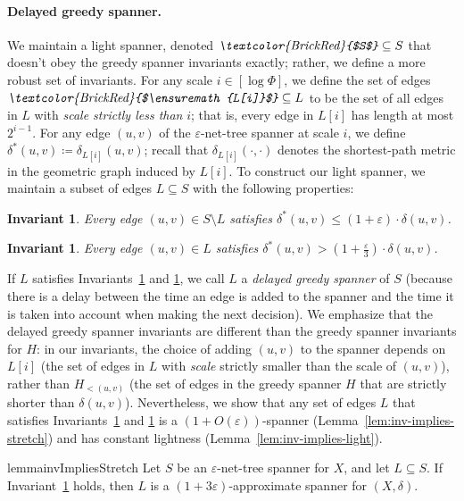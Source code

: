 \documentclass[11pt]{article}
\let\e\varepsilon               %
\def\EMPH#1{\emph{\textcolor{BrickRed} {#1}}}
\newtheorem{invariant}[theorem]{Invariant}
\newcommand{\dist}{\ensuremath{\delta}}
\newcommand{\lighti}[1]{\ensuremath{L[i]}}
\begin{document}
\paragraph{Delayed greedy spanner.} We maintain a light spanner, denoted $\EMPH{$S$} \subseteq S$
that doesn't obey the greedy spanner invariants exactly; rather, we define a more robust set of invariants. 
For any scale $i \in [\log \Phi]$, we define the set of edges $\EMPH{$\lighti i$}\subseteq L$ to be the set of all edges in $L$ with \emph{scale strictly less than} $i$; that is, every edge in $\lighti i$ has length at most $2^{i-1}$. 
For any edge $(u,v)$ of the $\e$-net-tree spanner at scale $i$, we define \EMPH{$\dist^*(u,v)$}$\coloneqq \dist_{\lighti i}(u,v)$; recall that $\dist_{\lighti i}(\cdot, \cdot)$ denotes the shortest-path metric in the geometric graph induced by $\lighti i$.
% 
To construct our light spanner, we maintain a subset of edges $L \subseteq S$ with the following properties:
\begin{invariant}
\label{inv:stretch}
    Every edge $(u,v) \in S \setminus L$ satisfies $\dist^*(u,v) \le (1+\e) \cdot \dist(u,v)$.
\end{invariant}
\begin{invariant}
\label{inv:light}
    Every edge $(u,v) \in L$ satisfies $\dist^*(u,v) > (1+\frac \e 3) \cdot \dist(u,v)$.
\end{invariant}
%
%
If $L$ satisfies Invariants~\ref{inv:stretch} and \ref{inv:light}, we call $L$ a \EMPH{delayed greedy spanner} of $S$
(because there is a delay between the time an edge is added to the spanner and the time it is taken into account when making the next decision). 
We emphasize that the delayed greedy spanner invariants are different than the greedy spanner invariants for $H$: in our invariants, the choice of adding $(u,v)$ to the spanner depends on $L[i]$ (the set of edges in $L$ with \emph{scale} strictly smaller than the scale of $(u,v)$), rather than $H_{<(u,v)}$ (the set of edges in the greedy spanner $H$ that are strictly shorter than $\dist(u,v)$). Nevertheless, we show that any set of edges $L$ that satisfies Invariants~\ref{inv:stretch} and \ref{inv:light} is a $(1+O(\e))$-spanner (Lemma~\ref{lem:inv-implies-stretch}) and has constant lightness (Lemma~\ref{lem:inv-implies-light}). 
% 
\begin{restatable}{lemma}{invImpliesStretch}
    \label{lem:inv-implies-stretch}
Let $S$ be an $\e$-net-tree spanner for $X$, and let $L \subseteq S$. 
If Invariant~\ref{inv:stretch} holds, then $L$ is a $(1+3 \e)$-approximate spanner for $(X, \dist)$.
\end{restatable}
\end{document}
